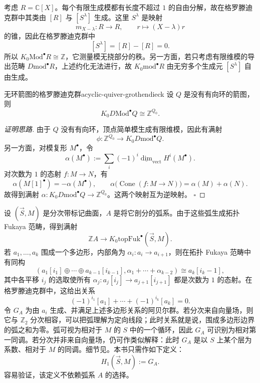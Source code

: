 \begin{example}[多项式环的模]
考虑 $R=\mathbb C[X]$。每个有限生成模都有长度不超过 $1$ 的自由分解，故在格罗滕迪克群中其类由 $[R]$ 与 $[S^\lambda]$ 生成。这里 $S^\lambda$ 是映射
\[
  m_{X-\lambda}\colon R\longrightarrow R,\qquad
  r\longmapsto(X-\lambda)r
\]
的锥，因此在格罗滕迪克群中
\[
  [S^\lambda]=[R]-[R]=0.
\]
所以 $K_0\mathrm{Mod}^{\bullet}R\cong\mathbb Z$，它测量模无挠部分的秩。另一方面，若只考虑有限维模的导出范畴 $D\mathrm{mod}^{\bullet}R$，上述约化无法进行，故 $K_0\mathrm{mod}^{\bullet}R$ 由无穷多个生成元 $[S^\lambda]$ 自由生成。
\end{example}

\begin{theorem}{无环箭图的格罗滕迪克群}{acyclic-quiver-grothendieck}
设 $Q$ 是没有有向环的箭图，则
\[
  K_0D\mathrm{Mod}^{\bullet}Q\cong\mathbb Z^{Q_0}.
\]
\end{theorem}
\begin{proof}[证明思路]
由于 $Q$ 没有有向环，顶点简单模生成有限维模，因此有满射
\[
  \phi\colon\mathbb Z^{Q_0}\longrightarrow K_0D\mathrm{mod}^{\bullet}Q.
\]
另一方面，对模复形 $M^{\bullet}$，令
\[
  \alpha(M^{\bullet}):=\sum_i(-1)^i\underline{\dim}_{\mathrm{vect}} H^i(M^{\bullet}).
\]
对次数为 $1$ 的态射 $f\colon M\to N$，有
\[
  \alpha(M[1]^{\bullet})=-\alpha(M^{\bullet}),\qquad
  \alpha\bigl(\operatorname{Cone}(f\colon M\to N)\bigr)
  =\alpha(M)+\alpha(N).
\]
故得到满射 $\alpha\colon K_0D\mathrm{mod}^{\bullet}Q\to\mathbb Z^{Q_0}$。这两个映射互为逆映射。
\hfill$\square$
\end{proof}

设 $(\vec S,M)$ 是分次带标记曲面，$A$ 是将它剖分的弧系。由于这些弧生成拓扑 Fukaya 范畴，得到满射
\[
  \mathbb Z A\longrightarrow K_0\mathrm{topFuk}^{\bullet}(\vec S,M).
\]
若 $a_1,\ldots,a_k$ 围成一个多边形，内部角为 $\alpha_i\colon a_i\to a_{i+1}$，则在拓扑 Fukaya 范畴中有同构
\[
  \left(a_1[i_1]\oplus\cdots\oplus a_{k-1}[i_{k-1}],
  \alpha_1+\cdots+\alpha_{k-2}\right)
  \cong a_k[i_k-1],
\]
其中各平移 $i_j$ 的选取使所有 $\alpha_j\colon a_j[i_j]\to a_{j+1}[i_{j+1}]$ 都是次数为 $1$ 的态射。在格罗滕迪克群中，这给出关系
\[
  (-1)^{i_1}[a_1]+\cdots+(-1)^{i_k}[a_k]=0.
\]
令 $G_A$ 为由 $a_i$ 生成、并满足上述多边形关系的阿贝尔群。若分次来自向量场，则它与 $\mathbb Z_2$ 分次相容，可以把弧理解为定向线段；此时关系就是说，围成多边形边界的弧之和为零。弧可视为相对于 $M$ 的 $S$ 中的一个循环，因此 $G_A$ 可识别为相对第一同调。若分次并非来自向量场，仍可作类似解释：此时 $G_A$ 是以 $S$ 上某个层为系数、相对于 $M$ 的同调。细节见。本书只需作如下定义：
\[
  H_1(\vec S,M):=G_A.
\]
容易验证，该定义不依赖弧系 $A$ 的选择。


